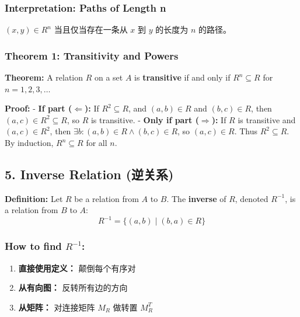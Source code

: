 \documentclass[10pt,a4paper,openany]{ctexbook}
\theoremstyle{definition}
\theoremstyle{remark}
\renewenvironment{quote}
  {\list{}{\leftmargin=1em\rightmargin=0pt\topsep=0.5pt\partopsep=0pt}\item[]}
  {\endlist}
\begin{document}
\subsubsection{Interpretation: Paths of Length n}

$(x,y) \in R^n$ 当且仅当存在一条从 $x$ 到 $y$ 的长度为 $n$ 的路径。
\subsubsection{Theorem 1: Transitivity and Powers}

\begin{quote}
\textbf{Theorem:} A relation $R$ on a set $A$ is \textbf{transitive} if and only if $R^n \subseteq R$ for $n = 1, 2, 3, \dots$

\textbf{Proof:}
- \textbf{If part ($\Leftarrow$):} If $R^2 \subseteq R$, and $(a,b) \in R$ and $(b,c) \in R$, then $(a,c) \in R^2 \subseteq R$, so $R$ is transitive.
- \textbf{Only if part ($\Rightarrow$):} If $R$ is transitive and $(a,c) \in R^2$, then $\exists b: (a,b) \in R \land (b,c) \in R$, so $(a,c) \in R$. Thus $R^2 \subseteq R$. By induction, $R^n \subseteq R$ for all $n$.

\end{quote}
\vspace{-2pt}

\subsection{5. Inverse Relation (逆关系)}

\textbf{Definition:} Let $R$ be a relation from $A$ to $B$. The \textbf{inverse} of $R$, denoted $R^{-1}$, is a relation from $B$ to $A$:
\[
R^{-1} = \{(a,b) \mid (b,a) \in R\}
\]

\subsubsection{How to find $R^{-1}$:}

\begin{enumerate}
\item \textbf{直接使用定义：} 颠倒每个有序对
\item \textbf{从有向图：} 反转所有边的方向
\item \textbf{从矩阵：} 对连接矩阵 $M_R$ 做转置 $M_R^T$

\end{enumerate}

\vspace{-2pt}
\end{document}
